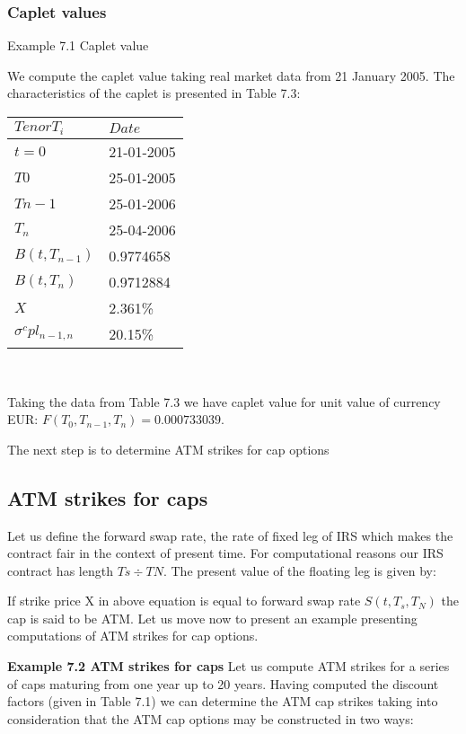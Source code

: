 \documentclass[11pt]{article}
\numberwithin{equation}{subsection}
\begin{document}
\subsubsection{Caplet values}

Example 7.1 Caplet value

We compute the caplet value taking real market data from 21 January 2005. The characteristics
of the caplet is presented in Table 7.3:


\vskip 0.2cm 		
{
	\centering
	\begin{tabular}{|l|l|}
		\hline
		\(Tenor T_i\) & \(Date\) \\		
		\hline
		\(t=0\)   &  21-01-2005 \\
		\(T0\)    &  25-01-2005 \\
		\(Tn−1\)  &  25-01-2006 \\
		\(T_n\)   &  25-04-2006 \\
		\(B(t, T_{n−1})\)  &  0.9774658 \\
		\(B(t, T_{n})\)    &  0.9712884 \\
		\(X\)  			   &  2.361\%  \\
		\(\sigma^cpl_{n-1, n}\)  &  20.15\% \\
		\hline				 				
	\end{tabular}
}
\vskip 0.4cm\

Taking the data from Table 7.3 we have caplet value for unit value of currency EUR: \(F(T_{0}, T_{n-1}, T_{n})=0.000733039\).

The next step is to determine ATM strikes for cap options

\subsection{ATM strikes for caps}

Let us define the forward swap rate, the rate of fixed leg of IRS which makes the contract
fair in the context of present time. For computational reasons our IRS contract has length
\(Ts÷TN\). The present value of the floating leg is given by:


If strike price X in above equation is equal to forward swap rate \(S(t, T_s, T_N)\) the cap is
said to be ATM. Let us move now to present an example presenting computations of ATM
strikes for cap options.


\textbf{Example 7.2 ATM strikes for caps}
Let us compute ATM strikes for a series of caps maturing from one year up to 20
years. Having computed the discount factors (given in Table 7.1) we can determine the ATM cap strikes taking into consideration that the ATM cap options may be constructed in two ways:
\end{document}
